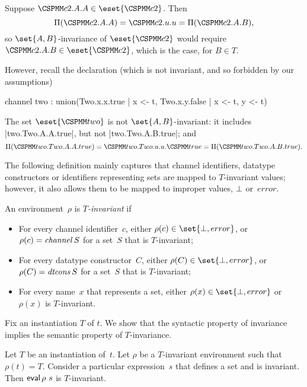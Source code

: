 
\begin{example}
Suppose $\M{c2}.A.A \in \eset{\M{c2}}$.  Then 
\[
\unitf(\M{c2}.A.A) = \M{c2}.\unit.\unit = \unitf(\M{c2}.A.B),
\]
so $\set{A,B}$-invariance of $\eset{\M{c2}}$ would require $\M{c2}.A.B \in
\eset{\M{c2}}$, which is the case, for $B \in T$.

However, recall the declaration (which is not invariant, and so forbidden by
our assumptions)
%
\begin{cspm}
channel two : union({Two.x.x.true | x <- t}, {Two.x.y.false | x <- t, y <- t})
\end{cspm}
%
The set $\eset{\M{two}}$ is not $\set{A,B}$-invariant: it includes
|two.Two.A.A.true|, but not |two.Two.A.B.true|; and
\[
\unitf(\M{two.Two.A.A.true}) = \M{two.Two}.u.u.\M{true} =
   \unitf(\M{two.Two.A.B.true}).
\]
\end{example}


The following definition mainly captures that channel identifiers, datatype
constructors or identifiers representing sets are mapped to $T$-invariant
values; however, it also allows them to be mapped to improper values,
$\perp$ or~$error$. 
%
\begin{definition}
An environment~$\rho$ is \emph{$T$-invariant} if
%
\begin{itemize}
\item For every channel identifier~$c$, either $\rho(c) \in \set{\bottom,
  error}$, or $\rho(c) = \mathop{\it channel} S$ for a set~$S$ that is $T$-invariant;

\item For every datatype constructor~$C$, either $\rho(C) \in \set{\bottom,
  error}$, or $\rho(C) = \mathop{\it dtcons} S$ for a set~$S$ that is $T$-invariant;

\item For every name~$x$ that represents a set, either $\rho(x) \in
  \set{\bottom, error}$ or $\rho(x)$ is $T$-invariant.
\end{itemize}
\end{definition}


Fix an instantiation $T$ of $t$.  We show that the syntactic property of
invariance implies the semantic property of $T$-invariance. 

\begin{lemma}
\label{lem:invariant}
Let $T$ be an instantiation of~$t$.  Let $\rho$ be a $T$-invariant environment
such that $\rho(t) = T$. 
%
Consider a particular expression~$s$ that defines a set and is invariant.
Then $\mathop{\sf eval} \rho~s$ is $T$-invariant.
\end{lemma}

